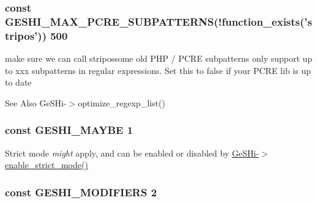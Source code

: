 \hypertarget{geshi_8php_a06b303abd49f800f6b8a853ccdb578aa}{
\subsubsection[{G\-E\-S\-H\-I\-\_\-\-M\-A\-X\-\_\-\-P\-C\-R\-E\-\_\-\-S\-U\-B\-P\-A\-T\-T\-E\-R\-N\-S}]{\setlength{\rightskip}{0pt plus 5cm}const G\-E\-S\-H\-I\-\_\-\-M\-A\-X\-\_\-\-P\-C\-R\-E\-\_\-\-S\-U\-B\-P\-A\-T\-T\-E\-R\-N\-S(!function\-\_\-exists('stripos')) 500}}\label{geshi_8php_a06b303abd49f800f6b8a853ccdb578aa}
make sure we can call stripossome old P\-H\-P / P\-C\-R\-E subpatterns only support up to xxx subpatterns in regular expressions. Set this to false if your P\-C\-R\-E lib is up to date \begin{DoxySeeAlso}{See Also}
Ge\-S\-Hi-\/$>$optimize\-\_\-regexp\-\_\-list() 
\end{DoxySeeAlso}
\hypertarget{geshi_8php_a080daa0b765d40f4278400ec7ee5516f}{
\subsubsection[{G\-E\-S\-H\-I\-\_\-\-M\-A\-Y\-B\-E}]{\setlength{\rightskip}{0pt plus 5cm}const G\-E\-S\-H\-I\-\_\-\-M\-A\-Y\-B\-E 1}}\label{geshi_8php_a080daa0b765d40f4278400ec7ee5516f}
Strict mode {\itshape might} apply, and can be enabled or disabled by \hyperlink{}{Ge\-S\-Hi-\/$>$enable\-\_\-strict\-\_\-mode()} \hypertarget{geshi_8php_af36b35daee7f0a188ebd83f81d93d7cb}{
\subsubsection[{G\-E\-S\-H\-I\-\_\-\-M\-O\-D\-I\-F\-I\-E\-R\-S}]{\setlength{\rightskip}{0pt plus 5cm}const G\-E\-S\-H\-I\-\_\-\-M\-O\-D\-I\-F\-I\-E\-R\-S 2}}\label{geshi_8php_af36b35daee7f0a188ebd83f81d93d7cb}
